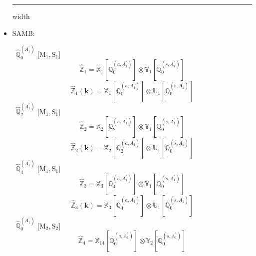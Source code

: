 \documentclass[fleqn,10pt,landscape]{article}
\begin{document}
\begin{itemize}
 \hfil \hrule height 1mm width \textwidth \hfil

\item SAMB:

\vspace{4mm}
\noindent {} $\,\,\,\hat{\mathbb{Q}}_{0}^{(A_{1}^{\prime})}$ [M$_{1}$,\,S$_{1}$]
\begin{dmath*}
\hat{\mathbb{Z}}_{1}=\mathbb{X}_{1}[\mathbb{Q}_{0}^{(a,A_{1}^{\prime})}] \otimes\mathbb{Y}_{1}[\mathbb{Q}_{0}^{(s,A_{1}^{\prime})}]
\end{dmath*}
\begin{dmath*}
\hat{\mathbb{Z}}_{1}(\bm{k})=\mathbb{X}_{1}[\mathbb{Q}_{0}^{(a,A_{1}^{\prime})}] \otimes\mathbb{U}_{1}[\mathbb{Q}_{0}^{(s,A_{1}^{\prime})}]
\end{dmath*}
\vspace{4mm}
\noindent {} $\,\,\,\hat{\mathbb{Q}}_{2}^{(A_{1}^{\prime})}$ [M$_{1}$,\,S$_{1}$]
\begin{dmath*}
\hat{\mathbb{Z}}_{2}=\mathbb{X}_{2}[\mathbb{Q}_{2}^{(a,A_{1}^{\prime})}] \otimes\mathbb{Y}_{1}[\mathbb{Q}_{0}^{(s,A_{1}^{\prime})}]
\end{dmath*}
\begin{dmath*}
\hat{\mathbb{Z}}_{2}(\bm{k})=\mathbb{X}_{2}[\mathbb{Q}_{2}^{(a,A_{1}^{\prime})}] \otimes\mathbb{U}_{1}[\mathbb{Q}_{0}^{(s,A_{1}^{\prime})}]
\end{dmath*}
\vspace{4mm}
\noindent {} $\,\,\,\hat{\mathbb{Q}}_{4}^{(A_{1}^{\prime})}$ [M$_{1}$,\,S$_{1}$]
\begin{dmath*}
\hat{\mathbb{Z}}_{3}=\mathbb{X}_{3}[\mathbb{Q}_{4}^{(a,A_{1}^{\prime})}] \otimes\mathbb{Y}_{1}[\mathbb{Q}_{0}^{(s,A_{1}^{\prime})}]
\end{dmath*}
\begin{dmath*}
\hat{\mathbb{Z}}_{3}(\bm{k})=\mathbb{X}_{3}[\mathbb{Q}_{4}^{(a,A_{1}^{\prime})}] \otimes\mathbb{U}_{1}[\mathbb{Q}_{0}^{(s,A_{1}^{\prime})}]
\end{dmath*}
\vspace{4mm}
\noindent {} $\,\,\,\hat{\mathbb{Q}}_{0}^{(A_{1}^{\prime})}$ [M$_{2}$,\,S$_{2}$]
\begin{dmath*}
\hat{\mathbb{Z}}_{4}=\mathbb{X}_{14}[\mathbb{Q}_{0}^{(a,A_{1}^{\prime})}] \otimes\mathbb{Y}_{2}[\mathbb{Q}_{0}^{(s,A_{1}^{\prime})}]

\end{dmath*}
\end{itemize}
\end{document}
